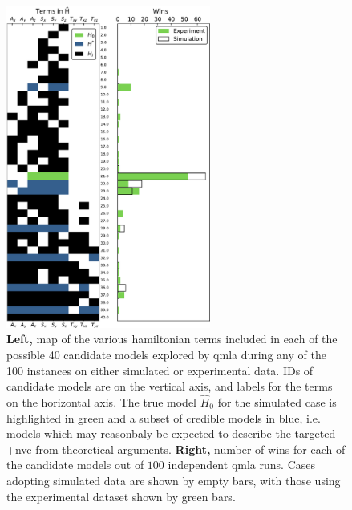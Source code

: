 \begin{figure}
    \begin{center}
        \includegraphics[width=0.6\textwidth]{experimental_study/figures/model_composition.pdf}
    \end{center}
    \caption[
        Models considered by QMLA for simulated/experimental nitrogen-vacancy centre data, and their win rates
    ]{
    \textbf{Left,} map of the various \gls{hamiltonian} terms included in each of the possible 40 candidate models explored by \gls{qmla}
    during any of the 100 \glspl{instance} on either simulated or experimental data.
    IDs of candidate models are on the vertical axis, and labels for the terms on the horizontal axis.
    The \gls{true model} $\hat{H}_0$ for the simulated case is highlighted in green and a subset of credible models in blue, 
    i.e. models which may reasonbaly be expected to describe the targeted \glsxtrlong+{nvc} from theoretical arguments.
    \textbf{Right,} number of wins for each of the candidate models out of $100$ independent \gls{qmla} \glspl{run}. 
    Cases adopting simulated data are shown by empty bars, with those using the experimental dataset shown by green bars.
    \figtableref
    } 
    \label{fig:nv_model_composition}
\end{figure}

